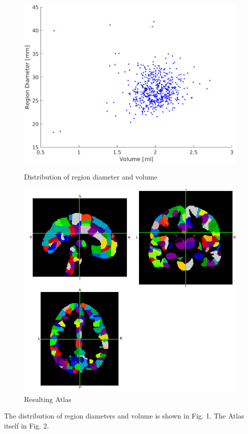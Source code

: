 \documentclass[12pt, a4paper]{article}
\begin{document}
\begin{figure}
\centering
\begin{minipage}{.5\textwidth}
  \centering
  \includegraphics[width=\linewidth]{2018-09-17_diameter_volume.png}
  \caption{Distribution of region diameter and volume}
\end{minipage}%
\begin{minipage}{.5\textwidth}
  \centering
  \includegraphics[width=\linewidth]{combined_atlas_new_labels_2018_09_17}
  \caption{Resulting Atlas}

\end{minipage}
\end{figure}

The distribution of region diameters and volume is shown in Fig. 1.
The Atlas itself in Fig. 2.
\end{document}
